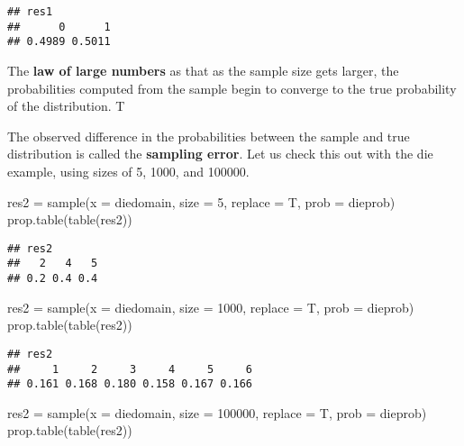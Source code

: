 \documentclass[
]{article}
\newenvironment{Shaded}{\begin{snugshade}}{\end{snugshade}}
\newcommand{\AttributeTok}[1]{\textcolor[rgb]{0.77,0.63,0.00}{#1}}
\newcommand{\DecValTok}[1]{\textcolor[rgb]{0.00,0.00,0.81}{#1}}
\newcommand{\FunctionTok}[1]{\textcolor[rgb]{0.00,0.00,0.00}{#1}}
\newcommand{\NormalTok}[1]{#1}
\newcommand{\OtherTok}[1]{\textcolor[rgb]{0.56,0.35,0.01}{#1}}
\begin{document}
\begin{verbatim}
## res1
##      0      1 
## 0.4989 0.5011
\end{verbatim}

The \textbf{law of large numbers} as that as the sample size gets
larger, the probabilities computed from the sample begin to converge to
the true probability of the distribution. T

The observed difference in the probabilities between the sample and true
distribution is called the \textbf{sampling error}. Let us check this
out with the die example, using sizes of 5, 1000, and 100000.

\begin{Shaded}
\begin{Highlighting}[]
\NormalTok{res2 }\OtherTok{=} \FunctionTok{sample}\NormalTok{(}\AttributeTok{x =}\NormalTok{ diedomain, }\AttributeTok{size =} \DecValTok{5}\NormalTok{, }\AttributeTok{replace =}\NormalTok{ T, }\AttributeTok{prob =}\NormalTok{ dieprob)}
\FunctionTok{prop.table}\NormalTok{(}\FunctionTok{table}\NormalTok{(res2))}
\end{Highlighting}
\end{Shaded}

\begin{verbatim}
## res2
##   2   4   5 
## 0.2 0.4 0.4
\end{verbatim}

\begin{Shaded}
\begin{Highlighting}[]
\NormalTok{res2 }\OtherTok{=} \FunctionTok{sample}\NormalTok{(}\AttributeTok{x =}\NormalTok{ diedomain, }\AttributeTok{size =} \DecValTok{1000}\NormalTok{, }\AttributeTok{replace =}\NormalTok{ T, }\AttributeTok{prob =}\NormalTok{ dieprob)}
\FunctionTok{prop.table}\NormalTok{(}\FunctionTok{table}\NormalTok{(res2))}
\end{Highlighting}
\end{Shaded}

\begin{verbatim}
## res2
##     1     2     3     4     5     6 
## 0.161 0.168 0.180 0.158 0.167 0.166
\end{verbatim}

\begin{Shaded}
\begin{Highlighting}[]
\NormalTok{res2 }\OtherTok{=} \FunctionTok{sample}\NormalTok{(}\AttributeTok{x =}\NormalTok{ diedomain, }\AttributeTok{size =} \DecValTok{100000}\NormalTok{, }\AttributeTok{replace =}\NormalTok{ T, }\AttributeTok{prob =}\NormalTok{ dieprob)}
\FunctionTok{prop.table}\NormalTok{(}\FunctionTok{table}\NormalTok{(res2))}
\end{Highlighting}
\end{Shaded}
\end{document}
